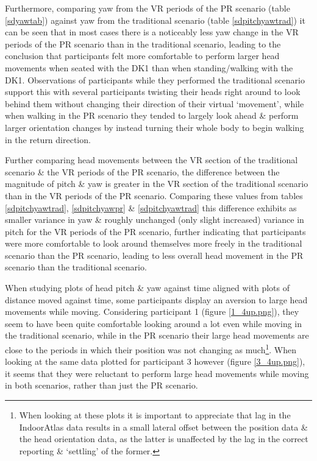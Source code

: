 Furthermore, comparing yaw from the VR periods of the PR scenario (table \ref{sdyawtab}) against yaw from the traditional scenario (table \ref{sdpitchyawtrad}) it can be seen that in most cases there is a noticeably less yaw change in the VR periods of the PR scenario than in the traditional scenario, leading to the conclusion that participants felt more comfortable to perform larger head movements when seated with the DK1 than when standing/walking with the DK1. Observations of participants while they performed the traditional scenario support this with several participants twisting their heads right around to look behind them without changing their direction of their virtual `movement', while when walking in the PR scenario they tended to largely look ahead \& perform larger orientation changes by instead turning their whole body to begin walking in the return direction.

Further comparing head movements between the VR section of the traditional scenario \& the VR periods of the PR scenario, the difference between the magnitude of pitch \& yaw is greater in the VR section of the traditional scenario than in the VR periods of the PR scenario. Comparing these values from tables \ref{sdpitchyawtrad}, \ref{sdpitchyawpr} \& \ref{sdpitchyawtrad} this difference exhibits as smaller variance in yaw \& roughly unchanged (only slight increased) variance in pitch for the VR periods of the PR scenario, further indicating that participants were more comfortable to look around themselves more freely in the traditional scenario than the PR scenario, leading to less overall head movement in the PR scenario than the traditional scenario.


When studying plots of head pitch \& yaw against time aligned with plots of distance moved against time, some participants display an aversion to large head movements while moving. Considering participant 1 (figure \ref{1_4up.png}), they seem to have been quite comfortable looking around a lot even while moving in the traditional scenario, while in the PR scenario their large head movements are close to the periods in which their position was not changing as much\footnote{When looking at these plots it is important to appreciate that lag in the IndoorAtlas data results in a small lateral offset between the position data \& the head orientation data, as the latter is unaffected by the lag in the correct reporting \& `settling' of the former.}. When looking at the same data plotted for participant 3 however (figure \ref{3_4up.png}), it seems that they were reluctant to perform large head movements while moving in both scenarios, rather than just the PR scenario.


